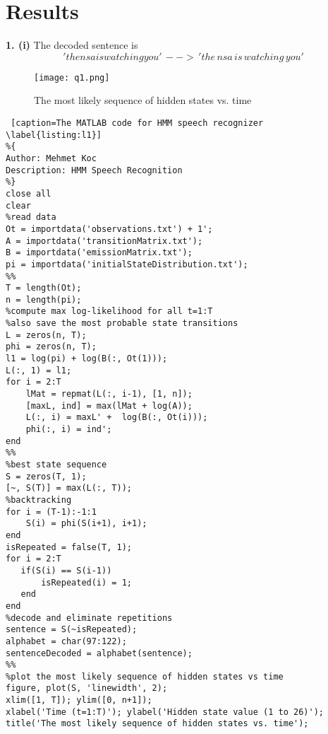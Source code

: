 \documentclass[]{report}
\begin{document}
\section*{Results}
\textbf{1. (i)} The decoded sentence is
$$
'thensaiswatchingyou'\, --> \, 'the\,nsa\,is\,watching\,you'
$$

\begin{figure}
\centering
\texttt{[image: q1.png]}
\caption{The most likely sequence of hidden states vs. time \label{fig:f1}}
\end{figure}

\begin{lstlisting} [caption=The MATLAB code for HMM speech recognizer  \label{listing:l1}]
%{
Author: Mehmet Koc
Description: HMM Speech Recognition
%}
close all
clear
%read data
Ot = importdata('observations.txt') + 1';
A = importdata('transitionMatrix.txt');
B = importdata('emissionMatrix.txt');
pi = importdata('initialStateDistribution.txt');
%%
T = length(Ot);
n = length(pi);
%compute max log-likelihood for all t=1:T
%also save the most probable state transitions
L = zeros(n, T);
phi = zeros(n, T);
l1 = log(pi) + log(B(:, Ot(1)));
L(:, 1) = l1;
for i = 2:T
    lMat = repmat(L(:, i-1), [1, n]); 
    [maxL, ind] = max(lMat + log(A));
    L(:, i) = maxL' +  log(B(:, Ot(i)));
    phi(:, i) = ind';
end
%%
%best state sequence
S = zeros(T, 1);
[~, S(T)] = max(L(:, T));
%backtracking
for i = (T-1):-1:1
    S(i) = phi(S(i+1), i+1);
end
isRepeated = false(T, 1);
for i = 2:T
   if(S(i) == S(i-1))
       isRepeated(i) = 1;
   end
end
%decode and eliminate repetitions
sentence = S(~isRepeated);
alphabet = char(97:122);
sentenceDecoded = alphabet(sentence);
%%
%plot the most likely sequence of hidden states vs time
figure, plot(S, 'linewidth', 2);
xlim([1, T]); ylim([0, n+1]);
xlabel('Time (t=1:T)'); ylabel('Hidden state value (1 to 26)');
title('The most likely sequence of hidden states vs. time');
\end{lstlisting}
\end{document}
